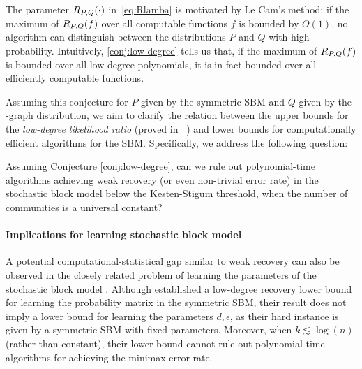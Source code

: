 The parameter $R_{P,Q}(\cdot)$ in~\eqref{eq:Rlamba} is motivated by Le Cam's method: if the maximum of $R_{P,Q}(f)$ over all computable functions $f$ is bounded by $O(1)$, no algorithm can distinguish between the distributions $P$ and $Q$ with high probability. Intuitively, \cref{conj:low-degree} tells us that, if the maximum of $R_{P,Q}(f)$ is bounded over all low-degree polynomials, it is in fact bounded over all efficiently computable functions.

Assuming this conjecture for $P$ given by the symmetric SBM and $Q$ given by the \Erdos-\Renyi graph distribution, we aim to clarify the relation between the upper bounds for the \emph{low-degree likelihood ratio} (proved in ~\cite{Hopkins18,bandeira2021spectral}) and lower bounds for computationally efficient algorithms for the SBM.
Specifically, we address the following question:
\begin{question}
    Assuming Conjecture \ref{conj:low-degree}, can we rule out polynomial-time algorithms achieving weak recovery (or even non-trivial error rate) in the stochastic block model below the Kesten-Stigum threshold, when the number of communities is a universal constant?
\end{question}

\paragraph{Implications for learning stochastic block model} A potential computational-statistical gap similar to weak recovery can also be observed in the closely related problem of learning the parameters of the stochastic block model \cite{Xu2017RatesOC}.
Although \cite{luo2023computational} established a low-degree recovery lower bound for learning the probability matrix in the symmetric SBM, their result does not imply a lower bound for learning the parameters $d,\epsilon$, as their hard instance is given by a symmetric SBM with fixed parameters.
Moreover, when $k\lesssim \log(n)$ (rather than constant), their lower bound cannot rule out polynomial-time algorithms for achieving the minimax error rate. 

